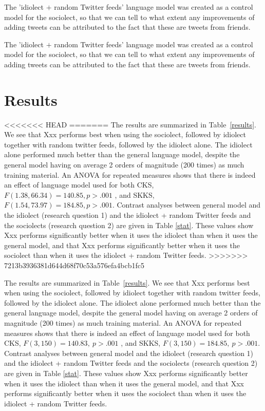 \documentclass[11pt]{article}
\begin{document}
The 'idiolect $+$ random Twitter feeds' language model was created as a control model for the sociolect, so that we can tell to what extent any improvements of adding tweets can be attributed to the fact that these are tweets from friends.

The 'idiolect $+$ random Twitter feeds' language model was created as a control model for the sociolect, so that we can tell to what extent any improvements of adding tweets can be attributed to the fact that these are tweets from friends.

\section{Results}

<<<<<<< HEAD
=======
The results are summarized in Table~\ref{results}. We see that Xxx performs best when using the sociolect, followed by idiolect together with random twitter feeds, followed by the idiolect alone. The idiolect alone performed much better than the general language model, despite the general model having on average 2 orders of magnitude (200 times) as much training material. An ANOVA for repeated measures shows that there is indeed an effect of language model used for both CKS, $F(1.38,66.34) = 140.85, p > .001$ , and SKKS, $F(1.54,73.97) = 184.85, p > .001$. Contrast analyses between general model and the idiolect (research question 1) and the idiolect + random Twitter feeds and the sociolects (research question 2) are given in Table \ref{stat}. These values show Xxx performs significantly better when it uses the idiolect than when it uses the general model, and that Xxx performs significantly better when it uses the sociolect than when it uses the idiolect + random Twitter feeds.
>>>>>>> 7213b3936381d644d68f70c53a576efa4bcb1fc5

The results are summarized in Table~\ref{results}. We see that Xxx performs best when using the sociolect, followed by idiolect together with random twitter feeds, followed by the idiolect alone. The idiolect alone performed much better than the general language model, despite the general model having on average 2 orders of magnitude (200 times) as much training material. An ANOVA for repeated measures shows that there is indeed an effect of language model used for both CKS, $F(3,150) = 140.83,\ p > .001$ , and SKKS, $F(3,150) = 184.85,\ p > .001$. Contrast analyses between general model and the idiolect (research question 1) and the idiolect + random Twitter feeds and the sociolects (research question 2) are given in Table \ref{stat}. These values show Xxx performs significantly better when it uses the idiolect than when it uses the general model, and that Xxx performs significantly better when it uses the sociolect than when it uses the idiolect + random Twitter feeds.
\end{document}
